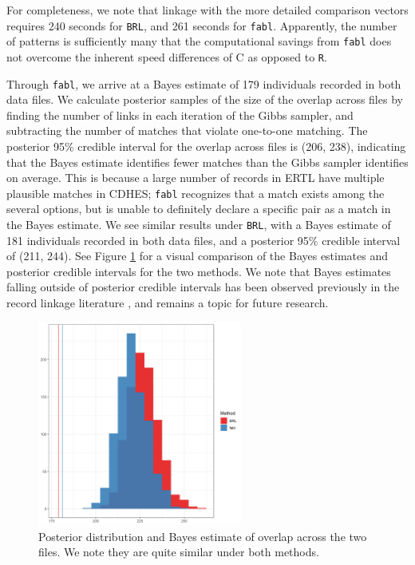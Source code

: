 \documentclass[ba]{imsart}
\begin{document}
	For completeness, we note that linkage with the more detailed comparison vectors requires 240 seconds for \texttt{BRL}, and 261 seconds for \texttt{fabl}.  Apparently, the number of patterns is sufficiently many that the computational savings from \texttt{fabl} does not overcome the inherent speed differences of C as opposed to \texttt{R}.
	
	Through \texttt{fabl}, we arrive at a Bayes estimate of 179 individuals recorded in both data files. We calculate posterior samples of the size of the overlap across files by finding the number of links in each iteration of the Gibbs sampler, and subtracting the number of matches that violate one-to-one matching. The posterior 95\% credible interval for the overlap across files is (206, 238), indicating that the Bayes estimate identifies fewer matches than the Gibbs sampler identifies on average. This is because a large number of records in ERTL have multiple plausible matches in CDHES; \texttt{fabl} recognizes that a match exists among the several options, but is unable to definitely declare a specific pair as a match in the Bayes estimate. We see similar results under \texttt{BRL}, with a Bayes estimate of 181 individuals recorded in both data files, and a posterior 95\% credible interval of (211, 244). See Figure \ref{fig:overlap-plot} for a visual comparison of the Bayes estimates and posterior credible intervals for the two methods. We note that Bayes estimates falling outside of posterior credible intervals has been observed previously in the record linkage literature \citep{sadinle_bayesian_2017, steorts_bayesian_2016}, and remains a topic for future research.
	

	
	\begin{figure}[t]
		\begin{center}
	\includegraphics[width=0.6\textwidth]{../notes/figures/el_salvador/overlap_distribution_smallP_bayes}
			\caption{Posterior distribution and Bayes estimate of overlap across the two files. We note they are quite similar under both methods.}
			\label{fig:overlap-plot}
		\end{center}
	\end{figure}
	
\end{document}
